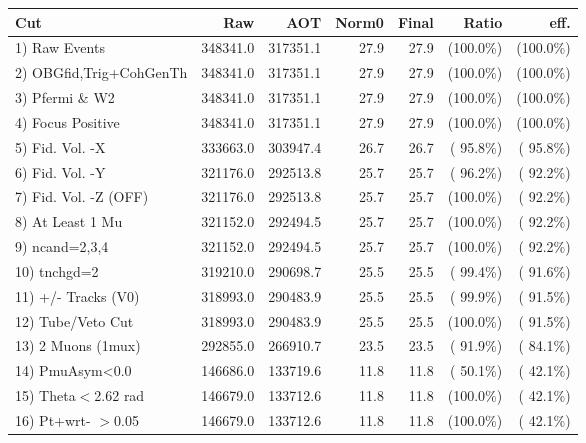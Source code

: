  \begin{table}[h!]\centering
 \begin{tabular}{||l||r|r|r|r|r|r||}
 \hline
 \hline
 Cut & Raw & AOT & Norm0 & Final & Ratio & eff.       \\
 \hline
  1) Raw Events           &     348341.0 &     317351.1 &         27.9 &         27.9 & (100.0\%) & (100.0\%) \\
  2) OBGfid,Trig+CohGenTh &     348341.0 &     317351.1 &         27.9 &         27.9 & (100.0\%) & (100.0\%) \\
  3) Pfermi \& W2         &     348341.0 &     317351.1 &         27.9 &         27.9 & (100.0\%) & (100.0\%) \\
  4) Focus Positive       &     348341.0 &     317351.1 &         27.9 &         27.9 & (100.0\%) & (100.0\%) \\
  5) Fid. Vol. -X         &     333663.0 &     303947.4 &         26.7 &         26.7 & ( 95.8\%) & ( 95.8\%) \\
  6) Fid. Vol. -Y         &     321176.0 &     292513.8 &         25.7 &         25.7 & ( 96.2\%) & ( 92.2\%) \\
  7) Fid. Vol. -Z (OFF)   &     321176.0 &     292513.8 &         25.7 &         25.7 & (100.0\%) & ( 92.2\%) \\
  8) At Least 1 Mu        &     321152.0 &     292494.5 &         25.7 &         25.7 & (100.0\%) & ( 92.2\%) \\
  9) ncand=2,3,4          &     321152.0 &     292494.5 &         25.7 &         25.7 & (100.0\%) & ( 92.2\%) \\
 10) tnchgd=2             &     319210.0 &     290698.7 &         25.5 &         25.5 & ( 99.4\%) & ( 91.6\%) \\
 11) +/- Tracks (V0)      &     318993.0 &     290483.9 &         25.5 &         25.5 & ( 99.9\%) & ( 91.5\%) \\
 12) Tube/Veto Cut        &     318993.0 &     290483.9 &         25.5 &         25.5 & (100.0\%) & ( 91.5\%) \\
 13) 2 Muons (1mux)       &     292855.0 &     266910.7 &         23.5 &         23.5 & ( 91.9\%) & ( 84.1\%) \\
 14) PmuAsym<0.0          &     146686.0 &     133719.6 &         11.8 &         11.8 & ( 50.1\%) & ( 42.1\%) \\
 15) Theta$<$2.62 rad     &     146679.0 &     133712.6 &         11.8 &         11.8 & (100.0\%) & ( 42.1\%) \\
 16) Pt+wrt- $>$0.05      &     146679.0 &     133712.6 &         11.8 &         11.8 & (100.0\%) & ( 42.1\%) \\

\end{tabular}
\end{table}
